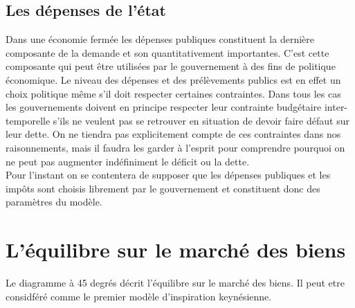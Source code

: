 \documentclass[10pt]{book}
\begin{document}
\subsection{Les dépenses de l'état}
Dans une économie fermée les dépenses publiques constituent la dernière composante de la demande et son quantitativement importantes. C'est cette composante qui peut être utilisées par le gouvernement à des fins de politique économique. Le niveau des dépenses et des prélèvements publics est en effet un choix politique même s'il doit respecter certaines contraintes. Dans tous les cas les gouvernements doivent en principe respecter leur contrainte budgétaire inter-temporelle s'ils ne veulent pas se retrouver en situation de devoir faire défaut sur leur dette. On ne tiendra pas explicitement compte de ces contraintes dans nos raisonnements, mais il faudra les garder à l'esprit pour comprendre pourquoi on ne peut pas augmenter indéfiniment le déficit ou la dette. \\
Pour l'instant on se contentera de supposer que les dépenses publiques et les impôts sont choisis librement par le gouvernement et constituent donc des paramètres du modèle.
\section{L'équilibre sur le marché des biens}
Le diagramme à 45 degrés décrit l'équilibre sur le marché des biens. Il peut etre considféré comme le premier modèle d'inspiration keynésienne.
\end{document}
